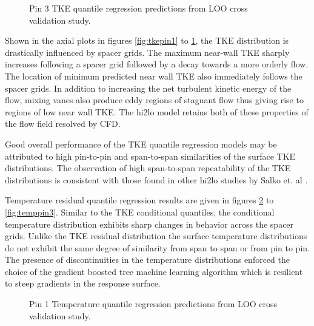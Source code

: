 \begin{figure}[H]%
    \centering
    \qquad
    \caption[Q-Q LOO TKE pin 3 results.]{Pin 3 TKE quantile regression predictions from LOO cross validation study.}%
    \label{fig:tkepin3}%
\end{figure}

Shown in the axial plots in figures \ref{fig:tkepin1} to \ref{fig:tkepin3}, the TKE distribution is drastically influenced by spacer grids.  The maximum near-wall TKE sharply increases following a spacer grid followed by a decay towards a more orderly flow.  The location of minimum predicted near wall TKE also immediately follows the spacer grids.  In addition to increasing the net turbulent kinetic energy of the flow, mixing vanes also produce eddy regions of stagnant flow thus giving rise to regions of low near wall TKE.  The hi2lo model retains both of these properties of the flow field resolved by CFD.

Good overall performance of the TKE quantile regression models may be attributed to high pin-to-pin and span-to-span similarities of the surface TKE distributions. The observation of high span-to-span repeatability of the TKE distributions is consistent with those found in other hi2lo studies by Salko et. al \cite{salko17}.

Temperature residual quantile regression results are given in figures \ref{fig:temppin1} to \ref{fig:temppin3}.  Similar to the TKE conditional quantiles, the conditional temperature distribution exhibits sharp changes in behavior across the spacer grids. Unlike the TKE residual distribution the surface temperature distributions do not exhibit the same degree of similarity from span to span or from pin to pin.  The presence of discontinuities in the temperature distributions enforced the choice of the gradient boosted tree machine learning algorithm which is resilient to steep gradients in the response surface.

\begin{figure}[H]%
    \centering
    \qquad
    \caption[Q-Q LOO Temperature pin 1 results.]{Pin 1 Temperature quantile regression predictions from LOO cross validation study.}%
    \label{fig:temppin1}%
\end{figure}

